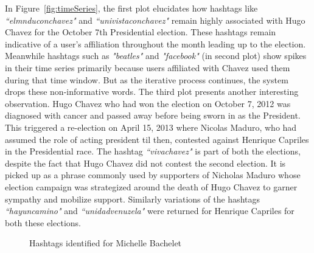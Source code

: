 In Figure~\ref{fig:timeSeries}, the first plot elucidates how hashtags like \emph{``elmnduconchavez"} and 
\emph{``univistaconchavez"} remain highly associated with Hugo Chavez for the October 7th Presidential election. 
These hashtags remain indicative of a user's affiliation throughout the month leading up to the election.
Meanwhile hashtags such as \emph{"beatles"} and \emph{"facebook"} (in second plot) show spikes in their time series primarily because users affiliated with Chavez used them during that time window. 
But as the iterative process continues, the system drops these non-informative words.
The third plot presents another interesting observation.
Hugo Chavez who had won the election on October 7, 2012 was diagnosed with cancer and passed away
before being sworn in as the President.
This triggered a re-election on April 15, 2013 where Nicolas Maduro, who had assumed the role of acting president til then, contested 
against Henrique Capriles in the Presidential race.
The hashtag \emph{``vivachavez"} is part of both the elections, despite the 
fact that Hugo Chavez did not contest the second election.
It is picked up as a phrase commonly used by supporters of Nicholas Maduro whose election campaign was strategized around the death of Hugo Chavez to garner sympathy and mobilize support.
Similarly variations of the hashtags \emph{``hayuncamino"} and \emph{``unidadvenuzela"} were returned 
for Henrique Capriles for both these elections.

\begin{figure}
	\centering
	\caption{Hashtags identified for Michelle Bachelet} 
	\label{fig:bacheletwordCloud}
\end{figure}

